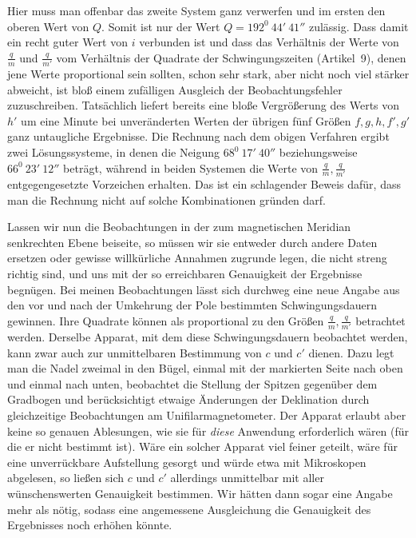 Hier muss man offenbar das zweite System ganz verwerfen und im ersten den oberen Wert von $Q$. Somit ist nur der Wert $Q=192^0\ 44'\ 41''$ zulässig. Dass damit ein recht guter Wert von $i$ verbunden ist und dass das Verhältnis der Werte von $\frac{q}{m}$ und $\frac{q}{m'}$ vom Verhältnis der Quadrate der Schwingungszeiten (Artikel\ 9), denen jene Werte proportional sein sollten, schon sehr stark, aber nicht noch viel stärker abweicht, ist bloß einem zufälligen Ausgleich der Beobachtungsfehler zuzuschreiben. Tatsächlich liefert bereits eine bloße Vergrößerung des Werts von $h'$ um eine Minute bei unveränderten Werten
der übrigen fünf Größen $f,g,h,f',g'$ ganz untaugliche Ergebnisse. Die Rechnung nach dem obigen Verfahren ergibt zwei Lösungssysteme, in denen die Neigung $68^0\ 17'\ 40''$ beziehungsweise $66^0\ 23'\ 12''$ beträgt, während in beiden Systemen die Werte von $\frac{q}{m},\frac{q}{m'}$ entgegengesetzte Vorzeichen erhalten. Das ist ein schlagender Beweis dafür, dass man die Rechnung nicht auf solche Kombinationen gründen darf.

Lassen wir nun die Beobachtungen in der zum magnetischen Meridian senkrechten Ebene beiseite, so müssen wir sie entweder durch andere Daten ersetzen oder gewisse willkürliche Annahmen zugrunde legen, die nicht streng richtig sind, und uns mit der so erreichbaren Genauigkeit der Ergebnisse begnügen. Bei meinen Beobachtungen lässt sich durchweg eine neue Angabe aus den vor und nach der Umkehrung der Pole bestimmten Schwingungsdauern gewinnen. Ihre Quadrate können als proportional zu den Größen $\frac{q}{m},\frac{q}{m'}$ betrachtet werden. Derselbe Apparat, mit dem diese Schwingungsdauern beobachtet werden, kann zwar auch zur unmittelbaren Bestimmung von $c$ und $c'$ dienen. Dazu legt man die Nadel zweimal in den Bügel, einmal mit der markierten Seite nach oben und einmal nach unten, beobachtet die Stellung der Spitzen gegenüber dem Gradbogen und berücksichtigt etwaige Änderungen der Deklination durch gleichzeitige Beobachtungen am Unifilarmagnetometer. Der Apparat erlaubt aber keine so genauen Ablesungen, wie sie für \textit{diese} Anwendung erforderlich wären (für die er nicht bestimmt ist). Wäre ein solcher Apparat viel feiner geteilt, wäre für eine unverrückbare Aufstellung gesorgt und würde etwa mit Mikroskopen abgelesen, so ließen sich $c$ und $c'$ allerdings unmittelbar mit aller wünschenswerten Genauigkeit bestimmen. Wir hätten dann sogar eine Angabe mehr als nötig, sodass eine angemessene Ausgleichung die Genauigkeit des Ergebnisses noch erhöhen könnte.


